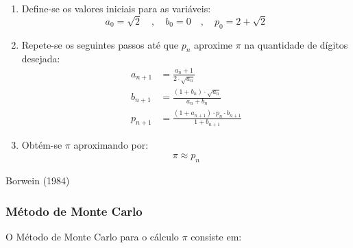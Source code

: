 \begin{algorithm}[H]
	\begin{enumerate}

		\item Define-se os valores iniciais para as variáveis:
			$$
				a_0 = \sqrt{2} \quad, \quad b_0 = 0 \quad, \quad p_0 = 2 + \sqrt{2}
			$$

		\item Repete-se os seguintes passos até que $p_n$ aproxime $\pi$ na quantidade
		de dígitos desejada:
			\begin{align}
				a_{n+1} & = \frac{a_n + 1}{2 \cdot \sqrt{a_n}}                        \label{eq:b-1} \\[1em]
				b_{n+1} & = \frac{(1 + b_n) \cdot \sqrt{a_n}}{a_n + b_n}              \label{eq:b-2} \\[1em]
				p_{n+1} & = \frac{(1 + a_{n+1}) \cdot p_n \cdot b_{n+1}}{1 + b_{n+1}} \label{eq:b-3}
			\end{align}

		\item Obtém-se $\pi$ aproximando por:
			\begin{align}
				\pi \approx p_n    \label{eq:b-4}
			\end{align}
	\end{enumerate}
\caption{Borwein (1984) \label{alg:borwein}}
\end{algorithm}

\subsubsection{Método de Monte Carlo}

O Método de Monte Carlo para o cálculo $\pi$ consiste em:

